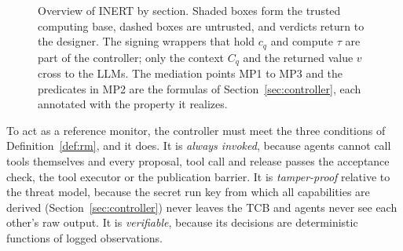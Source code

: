 \documentclass[pdflatex,sn-mathphys-num]{sn-jnl}
\theoremstyle{thmstyleone}%
\theoremstyle{thmstyletwo}%
\theoremstyle{thmstylethree}%
\begin{document}
\begin{figure}[tbp]
\caption{Overview of INERT by section. Shaded boxes form the trusted computing base, dashed boxes are untrusted, and verdicts return to the designer. The signing wrappers that hold $c_q$ and compute $\tau$ are part of the controller; only the context $C_q$ and the returned value $v$ cross to the LLMs. The mediation points MP1 to MP3 and the predicates in MP2 are the formulas of Section~\ref{sec:controller}, each annotated with the property it realizes.}\label{fig:overview}
\end{figure}

To act as a reference monitor, the controller must meet the three conditions of Definition~\ref{def:rm}, and it does. It is \emph{always invoked}, because agents cannot call tools themselves and every proposal, tool call and release passes the acceptance check, the tool executor or the publication barrier. It is \emph{tamper-proof} relative to the threat model, because the secret run key from which all capabilities are derived (Section~\ref{sec:controller}) never leaves the TCB and agents never see each other's raw output. It is \emph{verifiable}, because its decisions are deterministic functions of logged observations.
\end{document}
